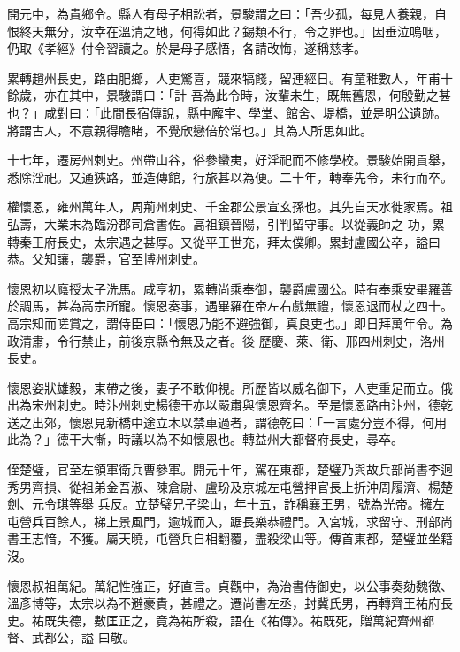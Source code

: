 \begin{pinyinscope}
 開元中，為貴鄉令。縣人有母子相訟者，景駿謂之曰：「吾少孤，每見人養親，自恨終天無分，汝幸在溫清之地，何得如此？錫類不行，令之罪也。」因垂泣嗚咽，仍取《孝經》付令習讀之。於是母子感悟，各請改悔，遂稱慈孝。



 累轉趙州長史，路由肥鄉，人吏驚喜，競來犒餞，留連經日。有童稚數人，年甫十餘歲，亦在其中，景駿謂曰：「計
 吾為此令時，汝輩未生，既無舊恩，何殷勤之甚也？」咸對曰：「此間長宿傳說，縣中廨宇、學堂、館舍、堤橋，並是明公遺跡。將謂古人，不意親得瞻睹，不覺欣戀倍於常也。」其為人所思如此。



 十七年，遷房州刺史。州帶山谷，俗參蠻夷，好淫祀而不修學校。景駿始開貢舉，悉除淫祀。又通狹路，並造傳館，行旅甚以為便。二十年，轉奉先令，未行而卒。



 權懷恩，雍州萬年人，周荊州刺史、千金郡公景宣玄孫也。其先自天水徙家焉。祖弘壽，大業末為臨汾郡司倉書佐。高祖鎮晉陽，引判留守事。以從義師之
 功，累轉秦王府長史，太宗遇之甚厚。又從平王世充，拜太僕卿。累封盧國公卒，謚曰恭。父知讓，襲爵，官至博州刺史。



 懷恩初以廕授太子洗馬。咸亨初，累轉尚乘奉御，襲爵盧國公。時有奉乘安畢羅善於調馬，甚為高宗所寵。懷恩奏事，遇畢羅在帝左右戲無禮，懷恩退而杖之四十。高宗知而嗟賞之，謂侍臣曰：「懷恩乃能不避強御，真良吏也。」即日拜萬年令。為政清肅，令行禁止，前後京縣令無及之者。後
 歷慶、萊、衛、邢四州刺史，洛州長史。



 懷恩姿狀雄毅，束帶之後，妻子不敢仰視。所歷皆以威名御下，人吏重足而立。俄出為宋州刺史。時汴州刺史楊德干亦以嚴肅與懷恩齊名。至是懷恩路由汴州，德乾送之出郊，懷恩見新橋中途立木以禁車過者，謂德乾曰：「一言處分豈不得，何用此為？」德干大慚，時議以為不如懷恩也。轉益州大都督府長史，尋卒。



 侄楚璧，官至左領軍衛兵曹參軍。開元十年，駕在東都，楚璧乃與故兵部尚書李迥秀男齊損、從祖弟金吾淑、陳倉尉、盧玢及京城左屯營押官長上折沖周履濟、楊楚劍、元令琪等舉
 兵反。立楚璧兄子梁山，年十五，詐稱襄王男，號為光帝。擁左屯營兵百餘人，梯上景風門，逾城而入，踞長樂恭禮門。入宮城，求留守、刑部尚書王志愔，不獲。屬天曉，屯營兵自相翻覆，盡殺梁山等。傳首東都，楚璧並坐籍沒。



 懷恩叔祖萬紀。萬紀性強正，好直言。貞觀中，為治書侍御史，以公事奏劾魏徵、溫彥博等，太宗以為不避豪貴，甚禮之。遷尚書左丞，封冀氏男，再轉齊王祐府長史。祐既失德，數匡正之，竟為祐所殺，語在《祐傳》。祐既死，贈萬紀齊州都督、武都公，謚
 曰敬。




\end{pinyinscope}
